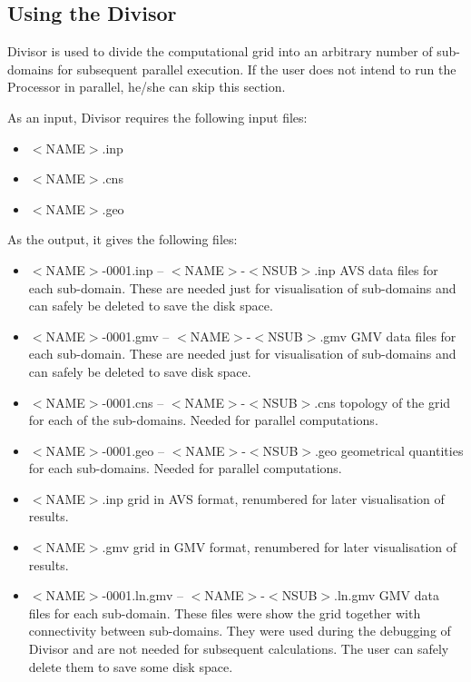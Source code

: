 \documentclass[10pt]{article}
\newcommand*{\tc}{\ttfamily} %
\newcommand*{\tn}{\sffamily} %
\begin{document}
%
    \subsection{Using the {\tn Divisor}}
%

    {\tn Divisor} is used to divide the computational grid into
    an arbitrary number of sub-domains for subsequent parallel
    execution. If the user does not intend to run the {\tn Processor} 
    in parallel, he/she can skip this section.

    As an input, {\tn Divisor} requires the following input 
    files:
    \begin{itemize} 
      \item {\tc $<$NAME$>$.inp}
      \item {\tc $<$NAME$>$.cns} 
      \item {\tc $<$NAME$>$.geo} 
    \end{itemize}    
    As the output, it gives the following files:
    \begin{itemize} 
      \item {\tc $<$NAME$>$-0001.inp} -- {\tc $<$NAME$>$-$<$NSUB$>$.inp}
            AVS data files for each sub-domain. These are 
            needed just for visualisation of sub-domains and can
            safely be deleted to save the disk space.
      \item {\tc $<$NAME$>$-0001.gmv} -- {\tc $<$NAME$>$-$<$NSUB$>$.gmv}
            GMV data files for each sub-domain. These are 
            needed just for visualisation of sub-domains and can
            safely be deleted to save disk space.
      \item {\tc $<$NAME$>$-0001.cns} -- {\tc $<$NAME$>$-$<$NSUB$>$.cns}
            topology of the grid for each of the sub-domains. 
            Needed for parallel computations.
      \item {\tc $<$NAME$>$-0001.geo} -- {\tc $<$NAME$>$-$<$NSUB$>$.geo}
            geometrical quantities for each sub-domains. 
            Needed for parallel computations.
      \item {\tc $<$NAME$>$.inp} grid in AVS format, renumbered 
            for later visualisation of results.
      \item {\tc $<$NAME$>$.gmv} grid in GMV format, renumbered 
            for later visualisation of results.
      \item {\tc $<$NAME$>$-0001.ln.gmv} -- {\tc $<$NAME$>$-$<$NSUB$>$.ln.gmv}
            GMV data files for each sub-domain. These files were
            show the grid together with connectivity between 
            sub-domains. They were used during the debugging of
            {\tn Divisor} and are not needed for subsequent 
            calculations. The user can safely delete them to save
            some disk space. 
    \end{itemize}    
\end{document}
